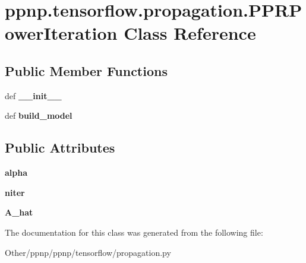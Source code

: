 \hypertarget{classppnp_1_1tensorflow_1_1propagation_1_1PPRPowerIteration}{}\section{ppnp.\+tensorflow.\+propagation.\+P\+P\+R\+Power\+Iteration Class Reference}
\label{classppnp_1_1tensorflow_1_1propagation_1_1PPRPowerIteration}
\subsection*{Public Member Functions}
\begin{DoxyCompactItemize}
\item 
\mbox{\label{classppnp_1_1tensorflow_1_1propagation_1_1PPRPowerIteration_a5724515d76ed4b5181ecea34edb5940e}} 
def {\bfseries \+\_\+\+\_\+init\+\_\+\+\_\+}
\item 
\mbox{\label{classppnp_1_1tensorflow_1_1propagation_1_1PPRPowerIteration_a0fbe528ef886ebd359f3921f100ea752}} 
def {\bfseries build\+\_\+model}
\end{DoxyCompactItemize}
\subsection*{Public Attributes}
\begin{DoxyCompactItemize}
\item 
\mbox{\label{classppnp_1_1tensorflow_1_1propagation_1_1PPRPowerIteration_a336852686d8b891f32de688f2b8f6fb9}} 
{\bfseries alpha}
\item 
\mbox{\label{classppnp_1_1tensorflow_1_1propagation_1_1PPRPowerIteration_a4a8ce4c4f854103d85a0ef48893d86a1}} 
{\bfseries niter}
\item 
\mbox{\label{classppnp_1_1tensorflow_1_1propagation_1_1PPRPowerIteration_a05e30e5b15c11cfcfb3502c1bf105008}} 
{\bfseries A\+\_\+hat}
\end{DoxyCompactItemize}


The documentation for this class was generated from the following file\+:\begin{DoxyCompactItemize}
\item 
Other/ppnp/ppnp/tensorflow/propagation.\+py\end{DoxyCompactItemize}
